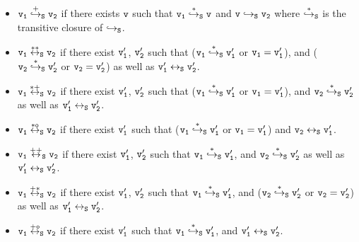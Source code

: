 \begin{itemize}
\item  $\tt v_1 \overset{+}\hookrightarrow_S v_2$ if there exists $\tt v$ such that $\tt v_1 \overset{*}\hookrightarrow_S v$ and $\tt v \hookrightarrow_S v_2$  where  $\tt \overset{*}\hookrightarrow_S$ is the transitive closure of $\tt \hookrightarrow_S$. 
\item $\tt v_1  \overset{**}\leftrightarrow_S  v_2$ if there exist $\tt v_1'$, $\tt v_2'$ such that ($\tt v_1  \overset{*}\hookrightarrow_S v_1'$ or $\tt v_1 = v_1'$), and ($\tt v_2  \overset{*}\hookrightarrow_S v_2'$ or $\tt v_2 = v_2'$) as well as $\tt v_1' \leftrightarrow_S v_2'$. 
\item $\tt v_1  \overset{*+}\leftrightarrow_S v_2$ if there exist $\tt v_1'$, $\tt v_2'$ such that ($\tt v_1  \overset{*}\hookrightarrow_S v_1'$ or $\tt v_1 = v_1'$), and $\tt v_2  \overset{*}\hookrightarrow_S v_2'$ as well as $\tt v_1' \leftrightarrow_S v_2'$. 
\item $\tt v_1  \overset{*o}\leftrightarrow_S v_2$ if there exist $\tt v_1'$ such that ($\tt v_1  \overset{*}\hookrightarrow_S v_1'$ or  $\tt v_1 = v_1'$) and  $\tt v_2 \leftrightarrow_S v_1'$.
\item $\tt v_1 \overset{++}\leftrightarrow_S v_2$ if there exist $\tt v_1'$, $\tt v_2'$ such that $\tt v_1  \overset{*}\hookrightarrow_S v_1'$, and $\tt v_2  \overset{*}\hookrightarrow_S v_2'$ as well as $\tt v_1' \leftrightarrow_S v_2'$.

\item $\tt v_1 \overset{+*}\leftrightarrow_S v_2$ if there exist $\tt v_1'$, $\tt v_2'$ such that $\tt v_1  \overset{*}\hookrightarrow_S v_1'$, and ($\tt v_2  \overset{*}\hookrightarrow_S v_2'$ or $\tt v_2 = v_2'$) as well as $\tt v_1' \leftrightarrow_S v_2'$.

\item $\tt v_1 \overset{+o}\leftrightarrow_S v_2$ if there exist $\tt v_1'$ such that $\tt v_1  \overset{*}\hookrightarrow_S v_1'$, and $\tt v_1' \leftrightarrow_S v_2'$.
\end{itemize}
 
